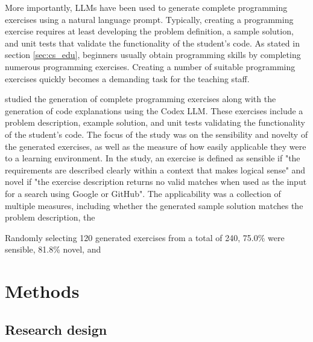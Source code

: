 \documentclass[english, 12pt, a4paper, sci, utf8, a-2b, online]{../definitions/aaltothesis}
\begin{document}
More importantly, LLMs have been used to generate complete programming exercises using a natural language prompt. Typically, creating a programming exercise requires at least developing the problem definition, a sample solution, and unit tests that validate the functionality of the student's code. As stated in section \ref{sec:cs_edu}, beginners usually obtain programming skills by completing numerous programming exercises. Creating a number of suitable programming exercises quickly becomes a demanding task for the teaching staff. 

\textcite{10.1145/3501385.3543957} studied the generation of complete programming exercises along with the generation of code explanations using the Codex LLM. These exercises include a problem description, example solution, and unit tests validating the functionality of the student's code. The focus of the study was on the sensibility and novelty of the generated exercises, as well as the measure of how easily applicable they were to a learning environment. In the study, an exercise is defined as sensible if "the requirements are described clearly within a context that makes logical sense" and novel if  "the exercise description returns no valid matches when used as the input for a search using Google or GitHub". The applicability was a collection of multiple measures, including whether the generated sample solution matches the problem description, the


Randomly selecting 120 generated exercises from a total of 240, 75.0\% were sensible, 81.8\% novel, and

\clearpage

\section{Methods}


\subsection{Research design}
\end{document}
